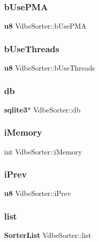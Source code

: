 \mbox{\label{struct_vdbe_sorter_ae373cf1d1f102b34e005f0326f690bd7}} 
\subsubsection{bUsePMA}
{\footnotesize\ttfamily \textbf{ u8} Vdbe\+Sorter\+::b\+Use\+P\+MA}

\mbox{\label{struct_vdbe_sorter_aaf62cb4ac61aa2bcbf4ee00a2e12fe90}} 
\subsubsection{bUseThreads}
{\footnotesize\ttfamily \textbf{ u8} Vdbe\+Sorter\+::b\+Use\+Threads}

\mbox{\label{struct_vdbe_sorter_a8289109b89d3798362e4edc596c3c887}} 
\subsubsection{db}
{\footnotesize\ttfamily \textbf{ sqlite3}$\ast$ Vdbe\+Sorter\+::db}

\mbox{\label{struct_vdbe_sorter_a32ec545e32e7b79fe8f72e15f4656786}} 
\subsubsection{iMemory}
{\footnotesize\ttfamily int Vdbe\+Sorter\+::i\+Memory}

\mbox{\label{struct_vdbe_sorter_aa7cc8519f1b6d621de13fc383fb5478a}} 
\subsubsection{iPrev}
{\footnotesize\ttfamily \textbf{ u8} Vdbe\+Sorter\+::i\+Prev}

\mbox{\label{struct_vdbe_sorter_a5e4a486d8aba4b45e3b7000d0a3b2b5b}} 
\subsubsection{list}
{\footnotesize\ttfamily \textbf{ Sorter\+List} Vdbe\+Sorter\+::list}

